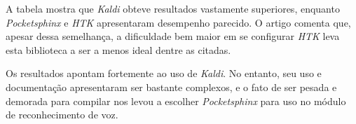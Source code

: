 A tabela mostra que \emph{Kaldi} obteve resultados vastamente superiores, enquanto \emph{Pocketsphinx} e \textit{HTK} apresentaram desempenho parecido. O artigo comenta que, apesar dessa semelhança, a dificuldade bem maior em se configurar \textit{HTK} leva esta biblioteca a ser a menos ideal dentre as citadas.

Os resultados apontam fortemente ao uso de \textit{Kaldi}. No entanto, seu uso e documentação apresentaram ser bastante complexos, e o fato de ser pesada e demorada para compilar nos levou a escolher \textit{Pocketsphinx} para uso no módulo de reconhecimento de voz.
